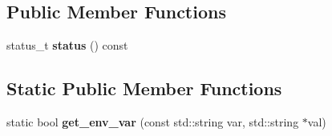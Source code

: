 \subsection*{Public Member Functions}
\begin{CompactItemize}
\item 
status\_\-t \textbf{status} () const \label{classSimSite3D_1_1BaseParameters_39657de7d43af517724736e1c625546f}

\end{CompactItemize}
\subsection*{Static Public Member Functions}
\begin{CompactItemize}
\item 
static bool \textbf{get\_\-env\_\-var} (const std::string var, std::string $\ast$val)\label{classSimSite3D_1_1BaseParameters_f0c9884a0104f3b2e8595d401db60653}

\end{CompactItemize}
